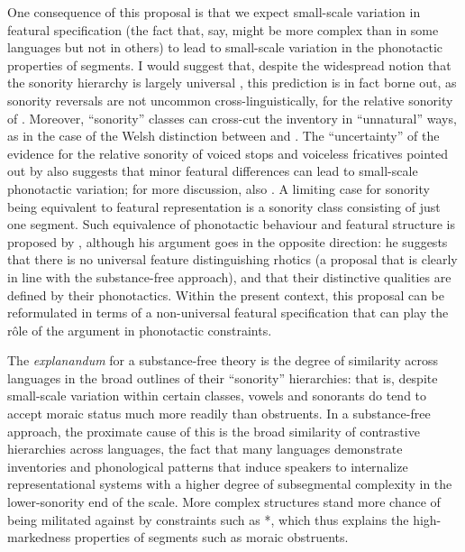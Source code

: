 One consequence of this proposal is that we expect small\hyp scale variation in featural specification (\ie the fact that, say, \ipa{[n]} might be more complex than \ipa{[m]} in some languages but not in others) to lead to small\hyp scale variation in the phonotactic properties of segments. I would suggest that, despite the widespread notion that the sonority hierarchy is largely universal \citep[\egm][]{clements90,wright,parker08:_sound}, this prediction is in fact borne out, as sonority reversals are not uncommon cross\hyp linguistically, \cf \citet{rice-liquids} for the relative sonority of \ipa{[l~r]}. Moreover, \enquote{sonority} classes can cross\hyp cut the inventory in \enquote{unnatural} ways, as in the case of the Welsh distinction between \ipa{[s~ʃ~ɬ]} and \ipa{[f~θ~χ]}. The \enquote{uncertainty} of the evidence for the relative sonority of voiced stops and voiceless fricatives pointed out by \citet{parker11:_sonor} also suggests that minor featural differences can lead to small\hyp scale phonotactic variation; for more discussion, \cf also \citet{gordon06:_syllab}. A limiting case for sonority being equivalent to featural representation is a sonority class consisting of just one segment. Such equivalence of phonotactic behaviour and featural structure is proposed by \citet{wiese-r}, although his argument goes in the opposite direction: he suggests that there is no universal feature distinguishing rhotics (a proposal that is clearly in line with the substance\hyp free approach), and that their distinctive qualities are defined by their phonotactics. Within the present context, this proposal can be reformulated in terms of a non\hyp universal featural specification that can play the rôle of the argument in phonotactic constraints.

The \emph{explanandum} for a substance\hyp free theory is the degree of similarity across languages in the broad outlines of their \enquote{sonority} hierarchies: that is, despite small\hyp scale variation within certain classes, vowels and sonorants do tend to accept moraic status much more readily than obstruents. In a substance\hyp free approach, the proximate cause of this is the broad similarity of contrastive hierarchies across languages, \ie the fact that many languages demonstrate inventories and phonological patterns that induce speakers to internalize representational systems with a higher degree of subsegmental complexity in the lower\hyp sonority end of the scale. More complex structures stand more chance of being militated against by constraints such as *\mo[F], which thus explains the high\hyp markedness properties of segments such as moraic obstruents.

